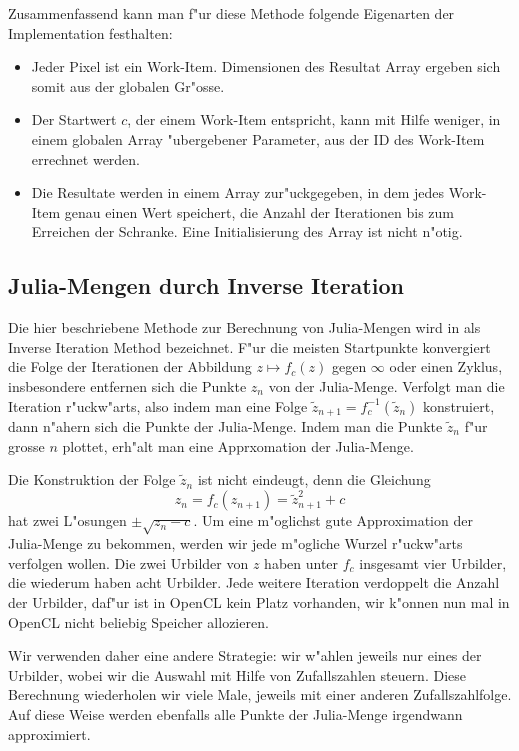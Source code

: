 \begin{refsection}
Zusammenfassend kann man f"ur diese Methode folgende Eigenarten der
Implementation festhalten:
\begin{itemize}
\item Jeder Pixel ist ein Work-Item. Dimensionen des Resultat Array
ergeben sich somit aus der globalen Gr"osse.
\item Der Startwert $c$, der einem Work-Item entspricht, kann mit Hilfe
weniger, in einem globalen Array "ubergebener Parameter, aus der
ID des Work-Item errechnet werden.
\item Die Resultate werden in einem Array zur"uckgegeben, in dem jedes
Work-Item genau einen Wert speichert, die Anzahl der Iterationen bis
zum Erreichen der Schranke.
Eine Initialisierung des Array ist nicht n"otig.
\end{itemize}

\subsection{Julia-Mengen durch Inverse Iteration}
Die hier beschriebene Methode zur Berechnung von Julia-Mengen wird in
\cite{julia:peitgenrichter} als Inverse Iteration Method bezeichnet.
F"ur die meisten Startpunkte konvergiert die Folge der Iterationen
der Abbildung $z\mapsto f_c(z)$ gegen $\infty$
oder einen Zyklus, insbesondere entfernen sich die Punkte $z_n$ von der
Julia-Menge.
Verfolgt man die Iteration r"uckw"arts, also indem man eine Folge
$\tilde z_{n+1}=f_c^{-1}(\tilde z_n)$ konstruiert, dann n"ahern sich die
Punkte der Julia-Menge. Indem man die Punkte $\tilde z_n$ f"ur grosse $n$
plottet, erh"alt man eine Apprxomation der Julia-Menge.

Die Konstruktion der Folge $\tilde z_n$ ist nicht eindeugt, denn die
Gleichung
\[
z_n= f_c(z_{n+1})=\tilde z_{n+1}^2+c
\]
hat zwei L"osungen $\pm\sqrt{z_n-c}$. 
Um eine m"oglichst gute Approximation der Julia-Menge zu bekommen, 
werden wir jede m"ogliche Wurzel r"uckw"arts verfolgen wollen.
Die zwei Urbilder von $z$ haben unter $f_c$ insgesamt vier Urbilder, 
die wiederum haben acht Urbilder.
Jede weitere Iteration verdoppelt die Anzahl der Urbilder, daf"ur ist
in OpenCL kein Platz vorhanden, wir k"onnen nun mal in OpenCL nicht beliebig
Speicher allozieren.

Wir verwenden daher eine andere Strategie: wir w"ahlen jeweils nur eines
der Urbilder, wobei wir die Auswahl mit Hilfe von Zufallszahlen steuern.
Diese Berechnung wiederholen wir viele Male, jeweils mit einer anderen
Zufallszahlfolge.
Auf diese Weise werden ebenfalls alle Punkte der Julia-Menge irgendwann
approximiert.


\end{refsection}
